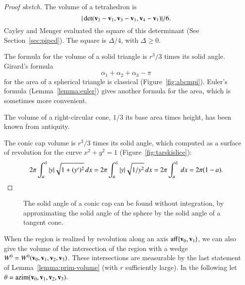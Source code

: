 \begin{proof}[Proof sketch]
The volume of a tetrahedron is
\[ 
|\det({\mathbf v}_2-{\mathbf v}_1,{\mathbf v}_3-{\mathbf v}_1,{\mathbf v}_4-{\mathbf v}_1)|/6.
\] 
Cayley and Menger evaluated the square of this determinant (See
Section~\ref{sec:piped}).  The square is $\Delta/4$, with
$\Delta\ge0$.  
%

The formula for the volume of a solid triangle is $r^3/3$ times
its solid angle.  Girard's formula
\begin{equation} 
\alpha_1+\alpha_2+\alpha_3-\pi\label{eqn:girard}
\end{equation}
for the area of a spherical triangle is classical
(Figure~\ref{fig:abcmpi}).  Euler's formula (Lemma~\ref{lemma:euler})
gives another formula for the area, which is sometimes more
convenient.
%
%
%

\figLWQUMHN %

The volume of a right-circular cone, $1/3$ its base area times height,
has been known from antiquity.  

\figWQBMWZO %

The conic cap volume is $r^3/3$ times its solid angle, which computed
as a surface of revolution for the curve $x^2 + y^2 = 1$
(Figure~\ref{fig:tarskislice}):
\[ 
2\pi \int_a^1  |y| \sqrt{1 + (y')^2}\,dx 
= 2\pi\int_a^1  |y| \sqrt{1/y^2}\,dx 
= 2\pi \int_a^1\,dx = 2\pi (1-a).\qedhere
\]
\end{proof}

\begin{figure}[htb]
\centering
{}
\caption{The solid angle of a conic cap can be found without
  integration, by approximating the solid angle of the sphere by the
  solid angle of a tangent cone.}
\label{fig:cc}
\end{figure}





%

When the region is realized by revolution along an axis
${\operatorname{aff}}\{{\mathbf v}_0,{\mathbf v}_1\}$, we can also give the volume of the
intersection of the region with a wedge
$W^0=W^0({\mathbf v}_0,{\mathbf v}_1,{\mathbf v}_2,{\mathbf v}_3)$.  These intersections are measurable by
the last statement of Lemma~\ref{lemma:prim-volume} (with $r$
sufficiently large).  In the following let $\theta =
{\operatorname{azim}}({\mathbf v}_0,{\mathbf v}_1,{\mathbf v}_2,{\mathbf v}_3)$.  %
%

